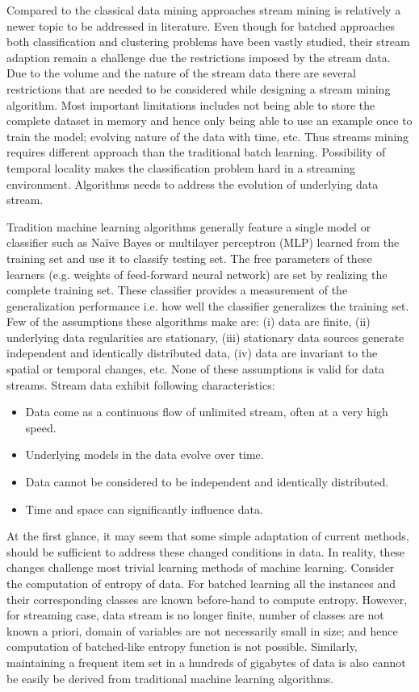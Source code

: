 \documentclass[a4paper, 11pt, oneside]{book}
\begin{document}
Compared to the classical data mining approaches stream mining is relatively a newer topic to be addressed in literature. Even though for batched approaches both classification and clustering problems have been vastly studied, their stream adaption remain a challenge due the restrictions imposed by the stream data. Due to the volume and the nature of the stream data there are several restrictions that are needed to be considered while designing a stream mining algorithm. Most important limitations includes not being able to store the complete dataset in memory and hence only being able to use an example once to train the model; evolving nature of the data with time, etc. Thus streams mining requires different approach than the traditional batch learning. Possibility of temporal locality makes the classification problem hard in a streaming environment. Algorithms needs to address the evolution of underlying data stream.

Tradition machine learning algorithms generally feature a single model or classifier such as Na\"ive Bayes or multilayer perceptron (MLP) learned from the training set and use it to classify testing set. The free parameters of these learners (e.g. weights of feed-forward neural network) are set by realizing the complete training set. These classifier provides a measurement of the generalization performance i.e. how well the classifier generalizes the training set. Few of the assumptions these algorithms make are: (i) data are finite, (ii) underlying data regularities are stationary, (iii) stationary data sources generate independent and identically distributed data, (iv) data are invariant to the spatial or temporal changes, etc. None of these assumptions is valid for data streams. Stream data exhibit following characteristics: 
\begin{itemize}
    \item Data come as a continuous flow of unlimited stream, often at a very high speed.
    \item Underlying models in the data evolve over time.
    \item Data cannot be considered to be independent and identically distributed.
    \item Time and space can significantly influence data.
\end{itemize}
At the first glance, it may seem that some simple adaptation of current methods, should be sufficient to address these changed conditions in data. In reality, these changes challenge most trivial learning methods of machine learning. Consider the computation of entropy of data. For batched learning all the instances and their corresponding classes are known before-hand to compute entropy. However, for streaming case, data stream is no longer finite, number of classes are not known a priori, domain of variables are not necessarily small in size; and hence computation of batched-like entropy function is not possible. Similarly, maintaining a frequent item set in a hundreds of gigabytes of data is also cannot be easily be derived from traditional machine learning algorithms.
\end{document}

